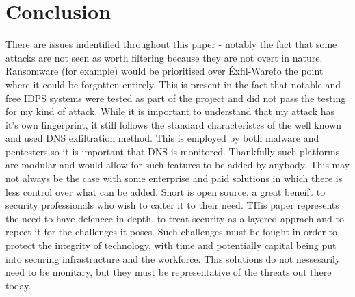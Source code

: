 \chapter{Conclusion}
There are issues indentified throughout this paper - notably the fact that some attacks are not seen as worth filtering because they are not overt in nature. Ransomware (for example) would be prioritised over \'Exfil-Ware\' to the point where it could be forgotten entirely. This is present in the fact that notable and free IDPS systems were tested as part of the project and did
not pass the testing for my kind of attack. While it is important to understand that my attack has it's own fingerprint, it still follows the standard characteristcs of the well known and used DNS exfiltration method. This is employed by both malware and pentesters so it is important that DNS is monitored. Thankfully such platforms are modular and would allow for such features to be added by anybody.
This may not always be the case with some enterprise and paid solutions in which there is less control over what can be added. Snort is open source, a great beneift to security professionals who wish to caiter it to their need. THis paper represents the need to have defencce in depth, to treat security as a layered apprach and to repect it for the challenges it poses.
Such challenges must be fought in order to protect the integrity of technology, with time and potentially capital being put into securing infrastructure and the workforce. This solutions do not nessesarily need to be monitary, but they must be representative of the threats out there today.

